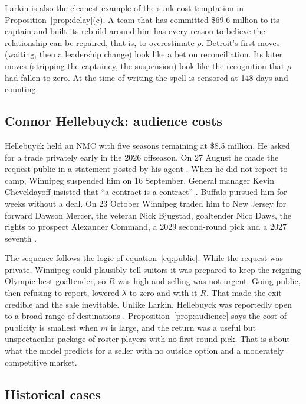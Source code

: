 Larkin is also the cleanest example of the sunk-cost temptation in Proposition~\ref{prop:delay}(c). A team that has committed \$69.6 million to its captain and built its rebuild around him has every reason to believe the relationship can be repaired, that is, to overestimate $\rho$. Detroit's first moves (waiting, then a leadership change) look like a bet on reconciliation. Its later moves (stripping the captaincy, the suspension) look like the recognition that $\rho$ had fallen to zero. At the time of writing the spell is censored at 148 days and counting.

\subsection{Connor Hellebuyck: audience costs}

Hellebuyck held an NMC with five seasons remaining at \$8.5 million. He asked for a trade privately early in the 2026 offseason. On 27 August he made the request public in a statement posted by his agent \citep{tsn_hellebuyck_open}. When he did not report to camp, Winnipeg suspended him on 16 September. General manager Kevin Cheveldayoff insisted that ``a contract is a contract'' \citep{nhl_hellebuyck_suspended}. Buffalo pursued him for weeks without a deal. On 23 October Winnipeg traded him to New Jersey for forward Dawson Mercer, the veteran Nick Bjugstad, goaltender Nico Daws, the rights to prospect Alexander Command, a 2029 second-round pick and a 2027 seventh \citep{nhl_hellebuyck_trade,tsn_hellebuyck_trade}.

The sequence follows the logic of equation~\eqref{eq:public}. While the request was private, Winnipeg could plausibly tell suitors it was prepared to keep the reigning Olympic best goaltender, so $R$ was high and selling was not urgent. Going public, then refusing to report, lowered $\lambda$ to zero and with it $R$. That made the exit credible and the sale inevitable. Unlike Larkin, Hellebuyck was reportedly open to a broad range of destinations \citep{thw_larkin_hellebuyck,tsn_hellebuyck_open}. Proposition~\ref{prop:audience} says the cost of publicity is smallest when $m$ is large, and the return was a useful but unspectacular package of roster players with no first-round pick. That is about what the model predicts for a seller with no outside option and a moderately competitive market.

\subsection{Historical cases}


